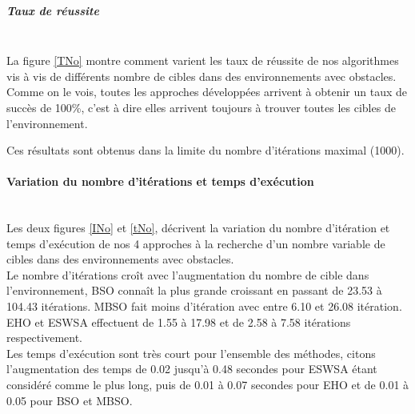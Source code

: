 \noindent
\begin{minipage}[t]{0.5\textwidth}
	\subparagraph{Taux de réussite}
	\textbf{}\\
	
	La figure \ref{TNo} montre comment varient les taux de réussite de nos algorithmes vis à vis de différents nombre de cibles dans des environnements avec obstacles.\\
	
	Comme on le vois, toutes les approches développées arrivent à obtenir un taux de succès de 100\%, c'est à dire elles arrivent toujours à trouver toutes les cibles de l'environnement.
	
	Ces résultats sont obtenus dans la limite du nombre d'itérations maximal (1000).
	
\end{minipage}\hfill
\begin{minipage}[t]{0.55\textwidth}
	\captionsetup{width=0.8\linewidth}
	\centering{}
	\label{TNo}
\end{minipage}\hfill




\noindent
	\paragraph{Variation du nombre d'itérations et temps d'exécution}
	\textbf{ }\\
	
	Les deux figures \ref{INo} et \ref{tNo}, décrivent la variation du nombre d'itération et temps d'exécution de nos 4 approches à la recherche d'un nombre variable de cibles dans des environnements avec obstacles.\\
	
	Le nombre d'itérations croît avec l'augmentation du nombre de cible dans l'environnement, BSO connaît la plus grande croissant en passant de 23.53 à 104.43 itérations. MBSO fait moins d'itération avec entre 6.10 et 26.08 itération. EHO et ESWSA effectuent de 1.55 à 17.98 et de 2.58 à 7.58 itérations respectivement.\\
	
	Les temps d'exécution sont très court pour l'ensemble des méthodes, citons l'augmentation des temps de 0.02 jusqu'à 0.48 secondes pour ESWSA étant considéré comme le plus long, puis de 0.01 à 0.07 secondes pour EHO et de 0.01 à 0.05 pour BSO et MBSO. 
	


